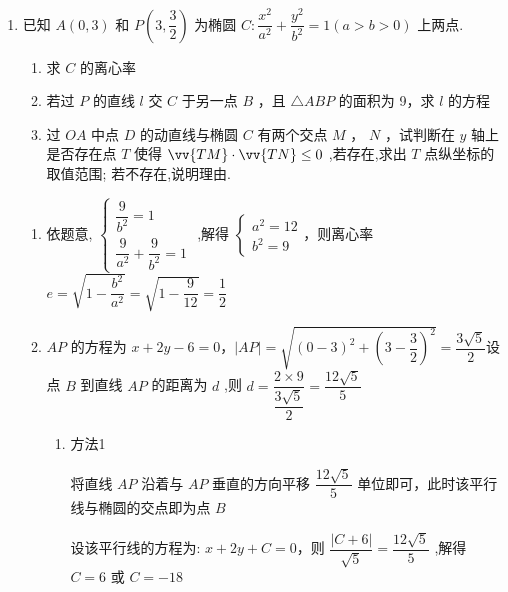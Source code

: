 \begin{enumerate}
\begin{jieda}
\begin{enumerate}
            $S_{\triangle QF_2N} = \dfrac{3}{2}|y_2| \leq \dfrac{3\sqrt{3}}{2}$，当$Q$为短轴顶点时取得最大值.
        \end{enumerate}
    \end{jieda}
    \item  已知 $A\left( {0,3}\right)$ 和 $P\left( {3,\dfrac{3}{2}}\right)$ 为椭圆 $C : \dfrac{{x}^{2}}{{a}^{2}} + \dfrac{{y}^{2}}{{b}^{2}} = 1\left( {a > b > 0}\right)$ 上两点.
    \begin{enumerate}
        \item 求 $C$ 的离心率
        \item 若过 $P$ 的直线 $l$ 交 $C$ 于另一点 $B$ ，且 $\bigtriangleup  {ABP}$ 的面积为 9，求 $l$ 的方程
        \item 过 ${OA}$ 中点 $D$ 的动直线与椭圆 $C$ 有两个交点 $M$ ， $N$ ，试判断在 $y$ 轴上是否存在点 $T$ 使得 $\vv{TM} \cdot  \vv{TN} \leq  0$ ,若存在,求出 $T$ 点纵坐标的取值范围; 若不存在,说明理由.
    \end{enumerate}
    \begin{jieda}
        \begin{enumerate}
            \item 依题意, $\left\{  \begin{array}{l} \dfrac{9}{{b}^{2}} = 1 \\  \dfrac{9}{{a}^{2}} + \dfrac{9}{{b}^{2}} = 1 \end{array}\right.$ ,解得 $\left\{  \begin{array}{l} {a}^{2} = {12} \\  {b}^{2} = 9 \end{array}\right.$，则离心率 $e = \sqrt{1 - \dfrac{{b}^{2}}{{a}^{2}}} = \sqrt{1 - \dfrac{9}{12}} = \dfrac{1}{2}$
            \item ${AP}$ 的方程为 $x + {2y} - 6 = 0$，$\left| {AP}\right|  = \sqrt{{\left( 0 - 3\right) }^{2} + {\left( 3 - \dfrac{3}{2}\right) }^{2}} = \dfrac{3\sqrt{5}}{2}$设点 $B$ 到直线 ${AP}$ 的距离为 $d$ ,则 $d = \dfrac{2 \times  9}{\dfrac{3\sqrt{5}}{2}} = \dfrac{{12}\sqrt{5}}{5}$
            \begin{enumerate}
                \item 方法1

                将直线 ${AP}$ 沿着与 ${AP}$ 垂直的方向平移 $\dfrac{{12}\sqrt{5}}{5}$ 单位即可，此时该平行线与椭圆的交点即为点 $B$
                
                设该平行线的方程为: $x + {2y} + C = 0$，则 $\dfrac{\left| C + 6\right| }{\sqrt{5}} = \dfrac{{12}\sqrt{5}}{5}$ ,解得 $C = 6$ 或 $C =  - {18}$ 


\end{enumerate}
\end{enumerate}
\end{jieda}
\end{enumerate}
